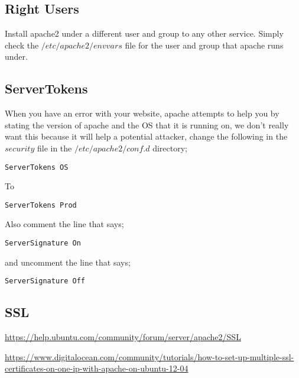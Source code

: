 \subsection{Right Users}

Install apache2 under a different user and group to any other service.  Simply check the $/etc/apache2/envvars$ file for the user and group that apache runs under.

\subsection{ServerTokens}

When you have an error with your website, apache attempts to help you by stating the version of apache and the OS that it is running on, we don't really want this because it will help a potential attacker, change the following in the $security$ file in the $/etc/apache2/conf.d$ directory;

\begin{verbatim}
ServerTokens OS
\end{verbatim}

To

\begin{verbatim}
ServerTokens Prod
\end{verbatim}

Also comment the line that says;

\begin{verbatim}
ServerSignature On
\end{verbatim}

and uncomment the line that says;

\begin{verbatim}
ServerSignature Off
\end{verbatim}

\subsection{SSL}

\url{https://help.ubuntu.com/community/forum/server/apache2/SSL}

\url{https://www.digitalocean.com/community/tutorials/how-to-set-up-multiple-ssl-certificates-on-one-ip-with-apache-on-ubuntu-12-04}